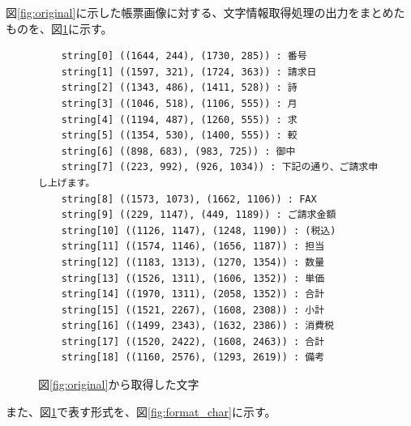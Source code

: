 図\ref{fig:original}に示した帳票画像に対する、文字情報取得処理の出力をまとめたものを、図\ref{fig:char_recognition_for_original}に示す。
\lstset{language=}
\begin{figure}[tp]
    \begin{lstlisting}
    string[0] ((1644, 244), (1730, 285)) : 番号
    string[1] ((1597, 321), (1724, 363)) : 請求日
    string[2] ((1343, 486), (1411, 528)) : 詩
    string[3] ((1046, 518), (1106, 555)) : 月
    string[4] ((1194, 487), (1260, 555)) : 求
    string[5] ((1354, 530), (1400, 555)) : 較
    string[6] ((898, 683), (983, 725)) : 御中
    string[7] ((223, 992), (926, 1034)) : 下記の通り、ご請求申し上げます。
    string[8] ((1573, 1073), (1662, 1106)) : FAX
    string[9] ((229, 1147), (449, 1189)) : ご請求金額
    string[10] ((1126, 1147), (1248, 1190)) : (税込)
    string[11] ((1574, 1146), (1656, 1187)) : 担当
    string[12] ((1183, 1313), (1270, 1354)) : 数量
    string[13] ((1526, 1311), (1606, 1352)) : 単価
    string[14] ((1970, 1311), (2058, 1352)) : 合計
    string[15] ((1521, 2267), (1608, 2308)) : 小計
    string[16] ((1499, 2343), (1632, 2386)) : 消費税
    string[17] ((1520, 2422), (1608, 2463)) : 合計
    string[18] ((1160, 2576), (1293, 2619)) : 備考
    \end{lstlisting}
    \caption{図\ref{fig:original}から取得した文字}
    \label{fig:char_recognition_for_original}
\end{figure}
また、図\ref{fig:char_recognition_for_original}で表す形式を、図\ref{fig:format_char}に示す。

